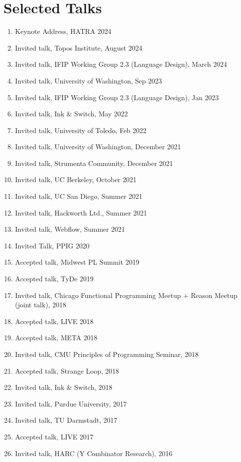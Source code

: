 \documentclass[10pt,letterpaper]{article}
\begin{document}
\section*{Selected Talks}
\begin{enumerate}
  \item Keynote Address, HATRA 2024
  \item Invited talk, Topos Institute, August 2024
  \item Invited talk, IFIP Working Group 2.3 (Language Design), March 2024
  \item Invited talk, University of Washington, Sep 2023
  \item Invited talk, IFIP Working Group 2.3 (Language Design), Jan 2023
  \item Invited talk, Ink \& Switch, May 2022
  \item Invited talk, University of Toledo, Feb 2022
  \item Invited talk, University of Washington, December 2021
  \item Invited talk, Strumenta Community, December 2021
  \item Invited talk, UC Berkeley, October 2021
  \item Invited talk, UC San Diego, Summer 2021
  \item Invited talk, Hackworth Ltd., Summer 2021
  \item Invited talk, Webflow, Summer 2021
  \item Invited Talk, PPIG 2020
  \item Accepted talk, Midwest PL Summit 2019
  \item Accepted talk, TyDe 2019
  \item Invited talk, Chicago Functional Programming Meetup + Reason Meetup (joint talk), 2018
  \item Accepted talk, LIVE 2018
  \item Accepted talk, META 2018
  \item Invited talk, CMU Principles of Programming Seminar, 2018
  \item Accepted talk, Strange Loop, 2018
  \item Invited talk, Ink \& Switch, 2018
  \item Invited talk, Purdue University, 2017
  \item Invited talk, TU Darmstadt, 2017
  \item Accepted talk, LIVE 2017
  \item Invited talk, HARC (Y Combinator Research), 2016

\end{enumerate}
\end{document}
